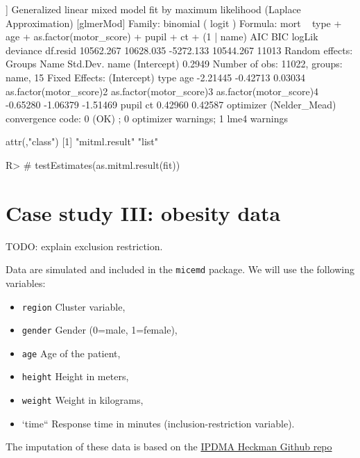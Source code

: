 \documentclass[
]{jss}
\providecommand{\tightlist}{%
  \setlength{\itemsep}{0pt}\setlength{\parskip}{0pt}}
\begin{document}
\begin{CodeChunk}
\begin{CodeOutput}
[[5]]
Generalized linear mixed model fit by maximum likelihood (Laplace
  Approximation) [glmerMod]
 Family: binomial  ( logit )
Formula: mort ~ type + age + as.factor(motor_score) + pupil + ct + (1 |  
    name)
      AIC       BIC    logLik  deviance  df.resid 
10562.267 10628.035 -5272.133 10544.267     11013 
Random effects:
 Groups Name        Std.Dev.
 name   (Intercept) 0.2949  
Number of obs: 11022, groups:  name, 15
Fixed Effects:
            (Intercept)                     type                      age  
               -2.21445                 -0.42713                  0.03034  
as.factor(motor_score)2  as.factor(motor_score)3  as.factor(motor_score)4  
               -0.65280                 -1.06379                 -1.51469  
                  pupil                       ct  
                0.42960                  0.42587  
optimizer (Nelder_Mead) convergence code: 0 (OK) ; 0 optimizer warnings; 1 lme4 warnings 

attr(,"class")
[1] "mitml.result" "list"        
\end{CodeOutput}
\begin{CodeInput}
R> # testEstimates(as.mitml.result(fit))
\end{CodeInput}
\end{CodeChunk}

\hypertarget{case-study-iii-obesity-data}{%
\section{Case study III: obesity
data}\label{case-study-iii-obesity-data}}

TODO: explain exclusion restriction.

Data are simulated and included in the \texttt{micemd} package. We will
use the following variables:

\begin{itemize}
\tightlist
\item
  \texttt{region} Cluster variable,
\item
  \texttt{gender} Gender (0=male, 1=female),
\item
  \texttt{age} Age of the patient,
\item
  \texttt{height} Height in meters,
\item
  \texttt{weight} Weight in kilograms,
\item
  `time`` Response time in minutes (inclusion-restriction variable).
\end{itemize}

The imputation of these data is based on the
\href{https://github.com/johamunoz/Heckman-IPDMA/blob/main/Toy_example.R}{IPDMA
Heckman Github repo}
\end{document}
